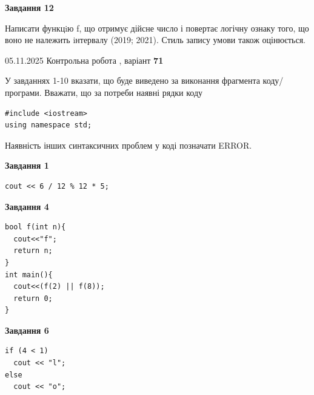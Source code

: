 \documentclass[12pt, ukrainian]{article}
\begin{document}
{\begin {large}
\begin{minipage}[t]{11.0cm}
\begin{center}
\textbf{Завдання 12}
\end{center}

Написати функцiю f, що отримує дійсне число і повертає логічну ознаку того, що воно не належить iнтервалу (2019; 2021). Стиль запису умови також оцінюється.\par

\end{minipage}

\end {large}}
\newpage

{\Large{05.11.2025 Контрольна робота , варіант  \No \textbf { 71 }\par}}
{
\begin {large}
У завданнях 1-10 вказати, що буде виведено за виконання фрагмента коду/про\-гра\-ми.
Вважати, що за потреби наявні рядки коду
\begin{verbatim}
#include <iostream>
using namespace std;
\end{verbatim}
Наявність інших синтаксичних проблем у коді позначати ERROR.

\begin{minipage}[t]{7.0cm}

\begin{center}
\textbf{Завдання 1}
\end{center}
\vspace{-8mm}

\begin{verbatim}
cout << 6 / 12 % 12 * 5;
\end{verbatim}



\begin{center}
\textbf{Завдання 4}
\end{center}
\vspace{-8mm}

\begin{verbatim}
bool f(int n){
  cout<<"f";
  return n;
}
int main(){
  cout<<(f(2) || f(8));
  return 0;
}
\end{verbatim}



\begin{center}
\textbf{Завдання 6}
\end{center}
\vspace{-8mm}

\begin{verbatim}
if (4 < 1)
  cout << "l";
else
  cout << "o";
\end{verbatim}




\end{minipage}
\end{large}}
\end{document}

